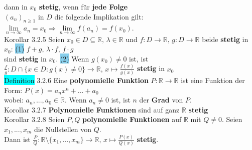 \documentclass[10pt]{article}
\begin{document}
                dann in \textcolor{NavyBlue}{$x_0$} \textbf{stetig}, wenn für 
                \textbf{jede Folge} \\
        \indent \textcolor{NavyBlue}{$(a_n)_{n\geqslant1}$} 
                in $D$ die folgende Implikation gilt: \textcolor{NavyBlue}{
                $\lim\limits_{n\to\infty}a_n=x_0\Longrightarrow
                \lim\limits_{n\to\infty}f(a_n)=f(x_0)$}.\\
\colorbox{BurntOrange}{Korollar 3.2.5} Seien 
                \textcolor{NavyBlue}{$x_0\in D\subseteq\mathbb{R},\,\lambda\in\mathbb{R}$} und 
                \textcolor{NavyBlue}{
                $f:D\longrightarrow\mathbb{R},\,g:D\longrightarrow\mathbb{R}$}
                beide \textbf{stetig} in \textcolor{NavyBlue}{$x_0$}:
                \colorbox{SkyBlue}{(1)} \textcolor{NavyBlue}{
                $f+g,\,\lambda\cdot f,\,f\cdot g$} \\
        \indent sind \textbf{stetig} in \textcolor{NavyBlue}{$x_0$}.
                \colorbox{SkyBlue}{(2)} Wenn $g(x_0)\neq0$ ist, ist 
                \textcolor{NavyBlue}{
                $\frac{f}{g}:D\cap\{x\in D:g(x)\neq0\}\longrightarrow\mathbb{R},\,
                x\longmapsto\frac{f(x)}{g(x)}$} \textbf{stetig} in \textcolor{NavyBlue}{$x_0$}\\
\colorbox{cyan}{Definition} 3.2.6 Eine \textbf{polynomielle Funktion} 
                \textcolor{NavyBlue}{$P:\mathbb{R}\longrightarrow\mathbb{R}$} ist eine Funktion 
                der Form: \textcolor{NavyBlue}{$P(x)=a_nx^n+...+a_0$}\\
        \indent wobei: \textcolor{NavyBlue}{$a_n,...,a_0\in\mathbb{R}$}. 
                Wenn \textcolor{NavyBlue}{$a_n\neq0$} ist, ist \textcolor{NavyBlue}{$n$} 
                der \textbf{Grad} von \textcolor{NavyBlue}{$P$}.\\
\colorbox{BurntOrange}{Korollar 3.2.7} \textbf{Polynomielle Funktionen} sind auf 
                ganz $\mathbb{R}$ \textbf{stetig}\\
\colorbox{BurntOrange}{Korollar 3.2.8} Seien $P,Q$ \textbf{polynomielle Funktionen} 
                auf $\mathbb{R}$ mit \textcolor{NavyBlue}{$Q\neq0$}. Seien 
                \textcolor{NavyBlue}{$x_1,...,x_m$} die Nullstellen von 
                \textcolor{NavyBlue}{$Q$}. \\
        \indent Dann ist \textcolor{NavyBlue}{
                $\frac{P}{Q}:\mathbb{R}\setminus\{x_1,...,x_m\}\longrightarrow\mathbb{R},\,
                x\longmapsto\frac{P(x)}{Q(x)}$} \textbf{stetig}.\\
\end{document}
